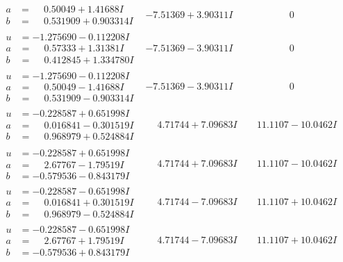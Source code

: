\documentclass[1p]{elsarticle_modified}
\theoremstyle{definition}
\begin{document}
$$\begin{array}{c|c|c}
\begin{aligned}
a &= \phantom{-}0.50049 + 1.41688 I \\
b &= \phantom{-}0.531909 + 0.903314 I\end{aligned}
 & -7.51369 + 3.90311 I & \phantom{-0.000000 } 0 \\ \hline\begin{aligned}
u &= -1.275690 - 0.112208 I \\
a &= \phantom{-}0.57333 + 1.31381 I \\
b &= \phantom{-}0.412845 + 1.334780 I\end{aligned}
 & -7.51369 - 3.90311 I & \phantom{-0.000000 } 0 \\ \hline\begin{aligned}
u &= -1.275690 - 0.112208 I \\
a &= \phantom{-}0.50049 - 1.41688 I \\
b &= \phantom{-}0.531909 - 0.903314 I\end{aligned}
 & -7.51369 - 3.90311 I & \phantom{-0.000000 } 0 \\ \hline\begin{aligned}
u &= -0.228587 + 0.651998 I \\
a &= \phantom{-}0.016841 - 0.301519 I \\
b &= \phantom{-}0.968979 + 0.524884 I\end{aligned}
 & \phantom{-}4.71744 + 7.09683 I & \phantom{-}11.1107 - 10.0462 I \\ \hline\begin{aligned}
u &= -0.228587 + 0.651998 I \\
a &= \phantom{-}2.67767 - 1.79519 I \\
b &= -0.579536 - 0.843179 I\end{aligned}
 & \phantom{-}4.71744 + 7.09683 I & \phantom{-}11.1107 - 10.0462 I \\ \hline\begin{aligned}
u &= -0.228587 - 0.651998 I \\
a &= \phantom{-}0.016841 + 0.301519 I \\
b &= \phantom{-}0.968979 - 0.524884 I\end{aligned}
 & \phantom{-}4.71744 - 7.09683 I & \phantom{-}11.1107 + 10.0462 I \\ \hline\begin{aligned}
u &= -0.228587 - 0.651998 I \\
a &= \phantom{-}2.67767 + 1.79519 I \\
b &= -0.579536 + 0.843179 I\end{aligned}
 & \phantom{-}4.71744 - 7.09683 I & \phantom{-}11.1107 + 10.0462 I \\ \hline\begin{aligned}

\end{aligned}
\end{array}$$
\end{document}
